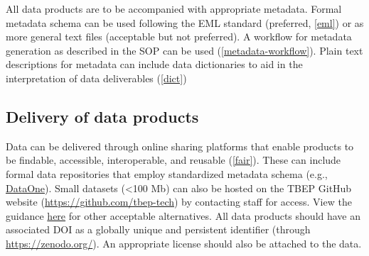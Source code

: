 \documentclass[
]{book}
\begin{document}
All data products are to be accompanied with appropriate metadata. Formal metadata schema can be used following the EML standard (preferred, \ref{eml}) or as more general text files (acceptable but not preferred). A workflow for metadata generation as described in the SOP can be used (\ref{metadata-workflow}). Plain text descriptions for metadata can include data dictionaries to aid in the interpretation of data deliverables (\ref{dict})

\subsection{Delivery of data products}\label{delivery-of-data-products}

Data can be delivered through online sharing platforms that enable products to be findable, accessible, interoperable, and reusable (\ref{fair}). These can include formal data repositories that employ standardized metadata schema (e.g., \href{https://www.dataone.org/}{DataOne}). Small datasets (\textless100 Mb) can also be hosted on the TBEP GitHub website (\url{https://github.com/tbep-tech}) by contacting staff for access. View the guidance \href{https://tbep-tech.github.io/data-management-sop/keys.html\#datahome}{here} for other acceptable alternatives. All data products should have an associated DOI as a globally unique and persistent identifier (through \url{https://zenodo.org/}). An appropriate license should also be attached to the data.

  
\end{document}
